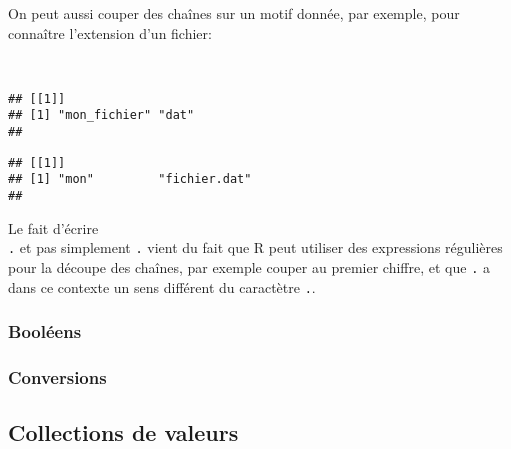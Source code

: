 \noindent On peut aussi couper des chaînes sur un motif donnée, par exemple, pour connaître l'extension d'un fichier:

\begin{knitrout}
\color{fgcolor}\begin{kframe}
\begin{flushleft}
\ttfamily\noindent
{}\hlassignement{\usebox{\hlnormalsizeboxlessthan}-}{\ }\hspace*{\fill}\\
\hlstd{}\hlkeyword{(}\hlkeyword{,}{\ }\hlkeyword{)}\mbox{}
\normalfont
\end{flushleft}
\begin{verbatim}
## [[1]]
## [1] "mon_fichier" "dat"        
## 
\end{verbatim}
\begin{flushleft}
\ttfamily\noindent
{}\hlkeyword{(}\hlkeyword{,}{\ }\hlkeyword{)}\mbox{}
\normalfont
\end{flushleft}
\begin{verbatim}
## [[1]]
## [1] "mon"         "fichier.dat"
## 
\end{verbatim}
\end{kframe}
\end{knitrout}


\noident Le fait d'écrire \texttt{\\.} et pas simplement \texttt{.} vient du fait que R peut utiliser des expressions régulières pour la découpe des chaînes,
par exemple couper au premier chiffre, et que \texttt{.} a dans ce contexte un sens différent du caractètre \texttt{.}.

\subsubsection{Booléens}

\subsubsection{Conversions}

\subsection{Collections de valeurs}

